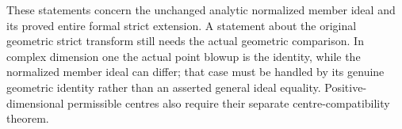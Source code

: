 These statements concern the unchanged analytic normalized member ideal
and its proved entire formal strict extension. A statement about the
original geometric strict transform still needs the actual geometric
comparison. In complex dimension one the actual point blowup is the
identity, while the normalized member ideal can differ; that case must
be handled by its genuine geometric identity rather than an asserted
general ideal equality. Positive-dimensional permissible centres also
require their separate centre-compatibility theorem.
